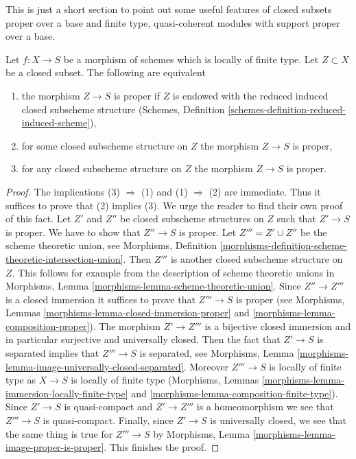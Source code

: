 \noindent
This is just a short section to point out some useful features
of closed subsets proper over a base and finite type, quasi-coherent
modules with support proper over a base.

\begin{lemma}
\label{lemma-closed-proper-over-base}
Let $f : X \to S$ be a morphism of schemes which is locally of finite type.
Let $Z \subset X$ be a closed subset. The following are equivalent
\begin{enumerate}
\item the morphism $Z \to S$ is proper if $Z$ is endowed with the reduced
induced closed subscheme structure
(Schemes, Definition \ref{schemes-definition-reduced-induced-scheme}),
\item for some closed subscheme structure on $Z$ the morphism $Z \to S$
is proper,
\item for any closed subscheme structure on $Z$ the morphism
$Z \to S$ is proper.
\end{enumerate}
\end{lemma}

\begin{proof}
The implications (3) $\Rightarrow$ (1) and (1) $\Rightarrow$ (2)
are immediate. Thus it suffices to prove that (2) implies (3).
We urge the reader to find their own proof of this fact.
Let $Z'$ and $Z''$ be closed subscheme structures on $Z$
such that $Z' \to S$ is proper. We have to show that $Z'' \to S$ is proper.
Let $Z''' = Z' \cup Z''$ be the scheme theoretic union, see
Morphisms, Definition
\ref{morphisms-definition-scheme-theoretic-intersection-union}.
Then $Z'''$ is another closed subscheme structure on $Z$.
This follows for example from the description of scheme theoretic unions in
Morphisms, Lemma \ref{morphisms-lemma-scheme-theoretic-union}.
Since $Z'' \to Z'''$ is a closed immersion it suffices to prove
that $Z''' \to S$ is proper (see
Morphisms, Lemmas \ref{morphisms-lemma-closed-immersion-proper} and
\ref{morphisms-lemma-composition-proper}).
The morphism $Z' \to Z'''$ is a bijective closed immersion
and in particular surjective and universally closed.
Then the fact that $Z' \to S$ is separated implies that
$Z''' \to S$ is separated, see
Morphisms, Lemma \ref{morphisms-lemma-image-universally-closed-separated}.
Moreover $Z''' \to S$ is locally of finite type
as $X \to S$ is locally of finite type
(Morphisms, Lemmas \ref{morphisms-lemma-immersion-locally-finite-type} and
\ref{morphisms-lemma-composition-finite-type}).
Since $Z' \to S$ is quasi-compact and $Z' \to Z'''$ is a homeomorphism
we see that $Z''' \to S$ is quasi-compact.
Finally, since $Z' \to S$ is universally closed, we see that
the same thing is true for $Z''' \to S$ by
Morphisms, Lemma \ref{morphisms-lemma-image-proper-is-proper}.
This finishes the proof.
\end{proof}

